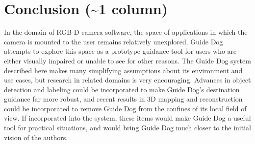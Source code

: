 \section{Conclusion (\textasciitilde 1 column)}
\label{sec:conclusion}

In the domain of RGB-D camera software, the space of applications in which the
camera is mounted to the user remains relatively unexplored. Guide Dog attempts
to explore this space as a prototype guidance tool for users who are either
visually impaired or unable to see for other reasons. The Guide Dog system
described here makes many simplifying assumptions about its environment and
use cases, but research in related domains is very encouraging. Advances in
object detection and labeling could be incorporated to make Guide Dog's
destination guidance far more robust, and recent results in 3D mapping and
reconstruction could be incorporated to remove Guide Dog from the confines
of its local field of view. If incorporated into the system, these items
would make Guide Dog a useful tool for practical situations, and would bring
Guide Dog much closer to the initial vision of the authors. 

